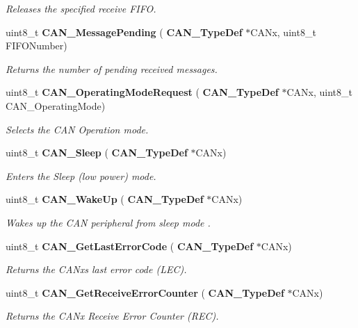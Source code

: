 \begin{DoxyCompactItemize}
\begin{DoxyCompactList}\small\item\em Releases the specified receive F\+I\+FO. \end{DoxyCompactList}\item 
uint8\+\_\+t \textbf{ C\+A\+N\+\_\+\+Message\+Pending} (\textbf{ C\+A\+N\+\_\+\+Type\+Def} $\ast$C\+A\+Nx, uint8\+\_\+t F\+I\+F\+O\+Number)
\begin{DoxyCompactList}\small\item\em Returns the number of pending received messages. \end{DoxyCompactList}\item 
uint8\+\_\+t \textbf{ C\+A\+N\+\_\+\+Operating\+Mode\+Request} (\textbf{ C\+A\+N\+\_\+\+Type\+Def} $\ast$C\+A\+Nx, uint8\+\_\+t C\+A\+N\+\_\+\+Operating\+Mode)
\begin{DoxyCompactList}\small\item\em Selects the C\+AN Operation mode. \end{DoxyCompactList}\item 
uint8\+\_\+t \textbf{ C\+A\+N\+\_\+\+Sleep} (\textbf{ C\+A\+N\+\_\+\+Type\+Def} $\ast$C\+A\+Nx)
\begin{DoxyCompactList}\small\item\em Enters the Sleep (low power) mode. \end{DoxyCompactList}\item 
uint8\+\_\+t \textbf{ C\+A\+N\+\_\+\+Wake\+Up} (\textbf{ C\+A\+N\+\_\+\+Type\+Def} $\ast$C\+A\+Nx)
\begin{DoxyCompactList}\small\item\em Wakes up the C\+AN peripheral from sleep mode . \end{DoxyCompactList}\item 
uint8\+\_\+t \textbf{ C\+A\+N\+\_\+\+Get\+Last\+Error\+Code} (\textbf{ C\+A\+N\+\_\+\+Type\+Def} $\ast$C\+A\+Nx)
\begin{DoxyCompactList}\small\item\em Returns the C\+A\+Nx\textquotesingle{}s last error code (L\+EC). \end{DoxyCompactList}\item 
uint8\+\_\+t \textbf{ C\+A\+N\+\_\+\+Get\+Receive\+Error\+Counter} (\textbf{ C\+A\+N\+\_\+\+Type\+Def} $\ast$C\+A\+Nx)
\begin{DoxyCompactList}\small\item\em Returns the C\+A\+Nx Receive Error Counter (R\+EC). \end{DoxyCompactList}\item 

\end{DoxyCompactItemize}

